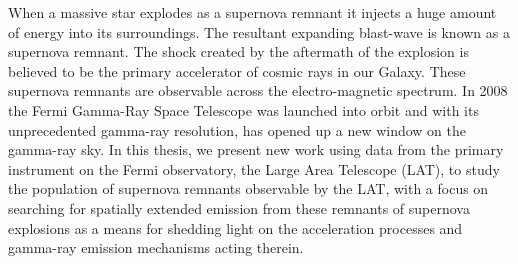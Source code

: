 \label{abstract}
When a massive star explodes as a supernova remnant it injects a huge amount of energy into its surroundings. The resultant expanding blast-wave is known as a supernova remnant. The shock created by the aftermath of the explosion is believed to be the primary accelerator of cosmic rays in our Galaxy. These supernova remnants are observable across the electro-magnetic spectrum. In 2008 the Fermi Gamma-Ray Space Telescope was launched into orbit and with its unprecedented gamma-ray resolution, has opened up a new window on the gamma-ray sky. In this thesis, we present new work using data from the primary instrument on the Fermi observatory, the Large Area Telescope (LAT), to study the population of supernova remnants observable by the LAT, with a focus on searching for spatially extended emission from these remnants of supernova explosions as a means for shedding light on the acceleration processes and gamma-ray emission mechanisms acting therein. 
